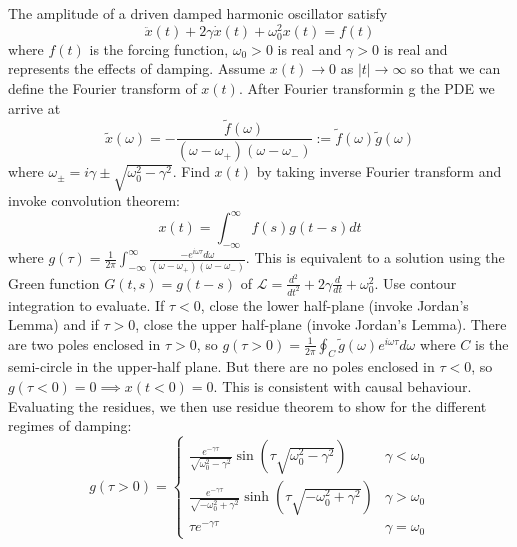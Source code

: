 \documentclass[a4paper]{article}
\begin{document}
\begin{eg}
The amplitude of a driven damped harmonic oscillator satisfy
$$\ddot{x}(t)+2\gamma\dot{x}(t)+\omega_0^2x(t)=f(t)$$
where $f(t)$ is the forcing function, $\omega_0>0$ is real and $\gamma>0$ is real and represents the effects of damping. Assume $x(t)\rightarrow0$ as $|t|\rightarrow\infty$ so that we can define the Fourier transform of $x(t)$. After Fourier transformin g the PDE we arrive at
$$\tilde{x}(\omega)=-\frac{\tilde{f}(\omega)}{(\omega-\omega_+)(\omega-\omega_-)}:=\tilde{f}(\omega)\tilde{g}(\omega)$$
where $\omega_\pm=i\gamma\pm\sqrt{\omega_0^2-\gamma^2}$. Find $x(t)$ by taking inverse Fourier transform and invoke convolution theorem:
$$x(t)=\int_{-\infty}^\infty f(s)g(t-s)dt$$
where $g(\tau)=\frac{1}{2\pi}\int_{-\infty}^\infty\frac{-e^{i\omega\tau}d\omega}{(\omega-\omega_+)(\omega-\omega_-)}$. This is equivalent to a solution using the Green function $G(t,s)=g(t-s)$ of $\mathcal{L}=\frac{d^2}{dt^2}+2\gamma\frac{d}{dt}+\omega_0^2$. Use contour integration to evaluate. If $\tau<0$, close the lower half-plane (invoke Jordan's Lemma) and if $\tau>0$, close the upper half-plane (invoke Jordan's Lemma). There are two poles enclosed in $\tau>0$, so $g(\tau>0)=\frac{1}{2\pi}\oint_C\tilde{g}(\omega)e^{i\omega\tau}d\omega$ where $C$ is the semi-circle in the upper-half plane. But there are no poles enclosed in $\tau<0$, so $g(\tau<0)=0\implies x(t<0)=0$. This is consistent with causal behaviour. Evaluating the residues, we then use residue theorem to show for the different regimes of damping:
$$g(\tau>0)=
\left\{
        \begin{array}{ll}
      \frac{e^{-\gamma\tau}}{\sqrt{\omega_0^2-\gamma^2}}\sin(\tau\sqrt{\omega_0^2-\gamma^2}) & \gamma<\omega_0\\
      \frac{e^{-\gamma\tau}}{\sqrt{-\omega_0^2+\gamma^2}}\sinh(\tau\sqrt{-\omega_0^2+\gamma^2}) & \gamma>\omega_0\\
      \tau e^{-\gamma\tau} & \gamma=\omega_0
        \end{array}
    \right.$$
\end{eg}
\end{document}
